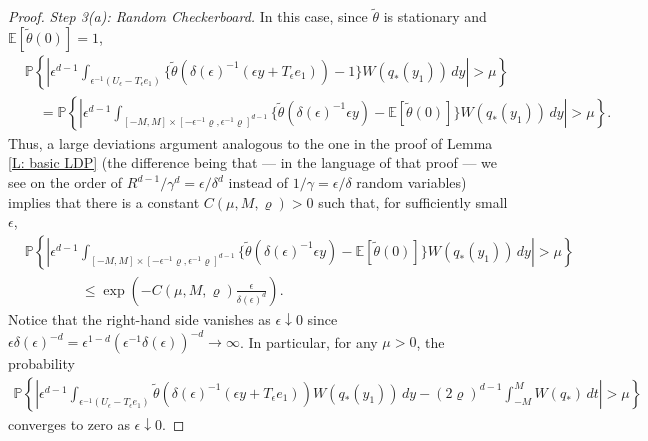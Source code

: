 \documentclass[12pt]{amsart}
\begin{document}
\begin{proof}
	
	\textit{Step 3(a): Random Checkerboard.} In this case, since $\tilde{\theta}$ is stationary and $\mathbb{E}[\tilde{\theta}(0)] = 1$, 
		\begin{align*}
			&\mathbb{P} \left\{ \left| \epsilon^{d-1} \int_{\epsilon^{-1} (U_{\epsilon} - T_{\epsilon}e_{1})} \{\tilde{\theta}(\delta(\epsilon)^{-1} (\epsilon y + T_{\epsilon}e_{1})) - 1 \} W(q_*(y_{1})) \, dy \right| > \mu \right\} \\
			&\quad = \mathbb{P} \left\{ \left| \epsilon^{d-1} \int_{ [-M,M] \times [-\epsilon^{-1} \varrho, \epsilon^{-1} \varrho]^{d-1} } \{ \tilde{\theta}(\delta(\epsilon)^{-1}\epsilon y) - \mathbb{E} [ \tilde{\theta}(0) ] \} W(q_*(y_{1})) \, dy \right| > \mu \right\}.
		\end{align*}
	Thus, a large deviations argument analogous to the one in the proof of Lemma \ref{L: basic LDP} (the difference being that --- in the language of that proof --- we see on the order of $ R^{d-1} / \gamma^d  = \epsilon / \delta^d $ instead of $ 1 / \gamma = \epsilon / \delta $ random variables) implies that  there is a constant $C(\mu,M,\varrho) > 0$ such that, for sufficiently small $\epsilon$,
		\begin{align*}
			&\mathbb{P} \left\{ \left| \epsilon^{d-1} \int_{ [-M,M] \times [-\epsilon^{-1} \varrho, \epsilon^{-1} \varrho]^{d-1} } \{ \tilde{\theta}(\delta(\epsilon)^{-1}\epsilon y) - \mathbb{E}[\tilde{\theta}(0)] \} W(q_*(y_{1})) \, dy \right| > \mu \right\} \\
			&\qquad \qquad \leq \exp \left( - C(\mu,M,\varrho) \frac{ \epsilon }{ \delta(\epsilon)^d } \right) .
		\end{align*}
		Notice that the right-hand side vanishes as $ \epsilon \downarrow 0 $ since $ \epsilon \delta(\epsilon)^{-d} = \epsilon^{ 1 - d } ( \epsilon^{-1} \delta(\epsilon) )^{-d} \rightarrow \infty $.  In particular, for any $\mu > 0$, the probability
		\begin{align*}
			\mathbb{P} \left\{ \left| \epsilon^{d-1} \int_{\epsilon^{-1}(U_{\epsilon} - T_{\epsilon} e_1 )} \tilde{\theta}(\delta(\epsilon)^{-1} ( \epsilon y + T_{\epsilon} e_{1} ) )  W(q_*(y_{1})) \, dy - (2\varrho)^{d-1} \int_{-M}^{M} W(q_{*}) \, dt \right| > \mu \right\}
		\end{align*}
	converges to zero as $\epsilon \downarrow 0$.
	

\end{proof}
\end{document}
